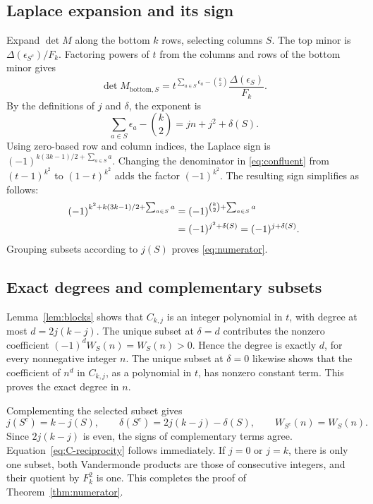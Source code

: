 \documentclass[11pt,a4paper]{article}
\theoremstyle{definition}
\theoremstyle{remark}
\numberwithin{equation}{section}
\begin{document}
\subsection{Laplace expansion and its sign}
Expand \(\det M\) along the bottom \(k\) rows, selecting columns \(S\).
The top minor is \(\Delta(\epsilon_{S^c})/F_k\). Factoring powers of
\(t\) from the columns and rows of the bottom minor gives
\begin{equation}
 \det M_{\text{bottom},S}
 =t^{\sum_{a\in S}\epsilon_a-\binom{k}{2}}
   \frac{\Delta(\epsilon_S)}{F_k}.
 \label{eq:bottom-minor}
\end{equation}
By the definitions of \(j\) and \(\delta\), the exponent is
\begin{equation}
 \sum_{a\in S}\epsilon_a-\binom{k}{2}
 =jn+j^2+\delta(S).
 \label{eq:exponent-split}
\end{equation}
Using zero-based row and column indices, the Laplace sign is
\((-1)^{k(3k-1)/2+\sum_{a\in S}a}\). Changing the denominator in
\eqref{eq:confluent} from \((t-1)^{k^2}\) to \((1-t)^{k^2}\) adds the
factor \((-1)^{k^2}\). The resulting sign simplifies as follows:
\begin{align}
 (-1)^{k^2+k(3k-1)/2+\sum_{a\in S}a}
 &=(-1)^{\binom{k}{2}+\sum_{a\in S}a}\notag\\
 &=(-1)^{j^2+\delta(S)}=(-1)^{j+\delta(S)}.
 \label{eq:sign}
\end{align}
Grouping subsets according to \(j(S)\) proves \eqref{eq:numerator}.

\subsection{Exact degrees and complementary subsets}
Lemma~\ref{lem:blocks} shows that \(C_{k,j}\) is an integer polynomial
in \(t\), with degree at most \(d=2j(k-j)\). The unique subset at
\(\delta=d\) contributes the nonzero coefficient
\((-1)^dW_S(n)=W_S(n)>0\). Hence the degree is exactly \(d\), for every
nonnegative integer \(n\). The unique subset at \(\delta=0\) likewise
shows that the coefficient of \(n^d\) in \(C_{k,j}\), as a polynomial
in \(t\), has nonzero constant term. This proves the exact degree in \(n\).

Complementing the selected subset gives
\begin{equation}
 j(S^c)=k-j(S),\qquad
 \delta(S^c)=2j(k-j)-\delta(S),\qquad W_{S^c}(n)=W_S(n).
 \label{eq:complement-subset}
\end{equation}
Since \(2j(k-j)\) is even, the signs of complementary terms agree.
Equation~\eqref{eq:C-reciprocity} follows immediately. If \(j=0\) or
\(j=k\), there is only one subset, both Vandermonde products are those
of consecutive integers, and their quotient by \(F_k^2\) is one.
This completes the proof of Theorem~\ref{thm:numerator}.
\end{document}
